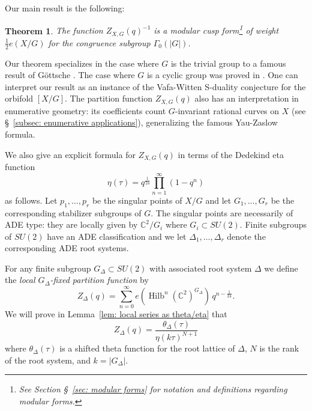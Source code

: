 \documentclass{article}
\newtheorem{theorem}{Theorem}%
\theoremstyle{definition}
\newcommand{\half}{\frac{1}{2}}
\newcommand{\CC} {{\mathbb C}}          %
\newcommand{\Hilb}{\operatorname{Hilb}}
\begin{document}
Our main result is the following:

\begin{theorem}
\label{thm:main}
The function $Z_{X,G}(q)^{-1}$ is a modular cusp form\footnote{See
Section \S~\ref{sec: modular forms}  for notation and definitions regarding modular
forms.} of weight $\half e(X/G)$ for the congruence subgroup
$\Gamma_{0}(|G|)$.
\end{theorem}
   

Our theorem specializes in the case where $G$ is the trivial group to
a famous result of G\"ottsche \cite{gottsche1990betti}. The case where
$G$ is a cyclic group was proved in \cite{bryan2018chl}. One can
interpret our result as an instance of the Vafa-Witten S-duality
conjecture for the orbifold $[X/G]$. The partition function
$Z_{X,G}(q)$ also has an interpretation in enumerative geometry: its coefficients count $G$-invariant rational curves on
$X$ (see \S~\ref{subsec: enumerative applications}), generalizing the
famous Yau-Zaslow formula.

We also give an explicit formula for $Z_{X,G}(q)$ in terms of the
Dedekind eta function
\[
\eta (\tau ) = q^{\frac{1}{24}}\prod_{n=1}^{\infty} (1-q^{n})
\]
as follows. Let $p_{1},\dots ,p_{r}$ be the singular points of $X/G$
and let $G_{1},\dots ,G_{r}$ be the corresponding stabilizer subgroups
of $G$. The singular points are necessarily of ADE type: they are
locally given by $\CC^{2}/G_{i}$ where $G_{i}\subset SU(2)$. Finite
subgroups of $SU(2)$ have an ADE classification and we let
$\Delta_{1},\dots ,\Delta_{r}$ denote the corresponding ADE root
systems.

For any finite subgroup $G_{\Delta}\subset SU(2)$ with associated root
system $\Delta$ we define the \emph{local $G_{\Delta }$-fixed
partition function} by
\[
Z_{\Delta} (q) = \sum_{n=0}^{\infty}
e\left(\Hilb^{n}(\CC^{2})^{G_{\Delta}} \right) \, q^{n-\frac{1}{24}} .
\]
We will prove in Lemma~\ref{lem: local series as theta/eta}  that
\[
Z_{\Delta}(q) =\frac{\theta_{\Delta}(\tau)}{\eta (k\tau )^{N+1}}
\]
where $\theta_{\Delta}(\tau )$ is a shifted theta function for the
root lattice of $\Delta$, $N$ is the rank of the root system, and
$k=|G_{\Delta}|$.
\end{document}
